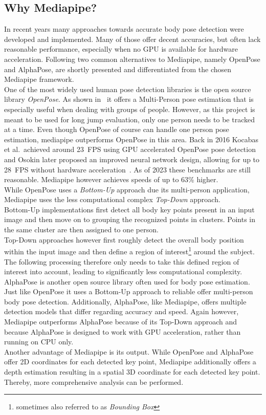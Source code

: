 \subsection{Why Mediapipe?}\label{subsec:2_why_mediapipe}
In recent years many approaches towards accurate body pose detection were 
developed and implemented.
Many of those offer decent accuracies, but often lack reasonable performance,
especially when no \ac{GPU} is available for hardware acceleration.
Following two common alternatives to Mediapipe, namely OpenPose and AlphaPose,
are shortly presented and differentiated from the chosen Mediapipe framework.\\
One of the most widely used human pose detection libraries is the open source 
library \textit{OpenPose}.
As shown in~\cite{openPose} it offers a Multi-Person pose estimation that is 
especially useful when dealing with groups of people.
However, as this project is meant to be used for long jump evaluation, only one 
person needs to be tracked at a time.
Even though OpenPose of course can handle one person pose estimation, 
mediapipe outperforms OpenPose in this area.
Back in 2016 Kocabas et al.~achieved around 23~FPS using \ac{GPU} accelerated
OpenPose pose detection~\cite{openPose_speed_gpu} and Osokin later proposed an
improved neural network design, allowing for up to 28~FPS without hardware 
acceleration~\cite{openPose_speed_cpu}.
As of 2023 these benchmarks are still reasonable.
Mediapipe however achieves speeds of up to 63\% higher.\\
While OpenPose uses a \textit{Bottom-Up} approach due its multi-person 
application, Mediapipe uses the less computational complex \textit{Top-Down} 
approach.\\
Bottom-Up implementations first detect all body key points present in an input
image and then move on to grouping the recognized points in clusters.
Points in the same cluster are then assigned to one person.\\
Top-Down approaches however first roughly detect the overall body position 
within the input image and then define a region of interest\footnote{sometimes
also referred to as \textit{Bounding Box}} around the subject.
The following processing therefore only needs to take this defined region of 
interest into account, leading to significantly less computational complexity.\\
AlphaPose is another open source library often used for body pose estimation.
Just like OpenPose it uses a Bottom-Up approach to reliable offer multi-person
body pose detection.
Additionally, AlphaPose, like Mediapipe, offers multiple detection models that 
differ regarding accuracy and speed.
Again however, Mediapipe outperforms AlphaPose because of its Top-Down approach
and because AlphaPose is designed to work with \ac{GPU} acceleration, rather 
than running on \ac{CPU} only.\\
Another advantage of Mediapipe is its output.
While OpenPose and AlphaPose offer 2D coordinates for each detected key point,
Mediapipe additionally offers a depth estimation resulting in a spatial 3D 
coordinate for each detected key point.
Thereby, more comprehensive analysis can be performed.   

